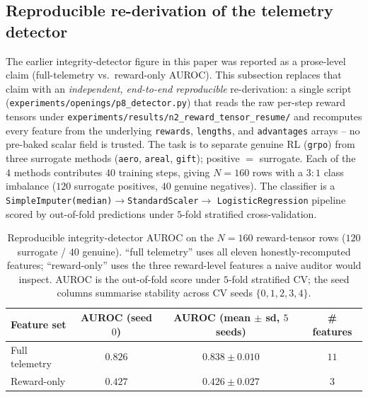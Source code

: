 \subsection{Reproducible re-derivation of the telemetry detector}
\label{sec:p8-reproducible-detector}

The earlier integrity-detector figure in this paper was reported as a
prose-level claim (full-telemetry vs.\ reward-only AUROC). This
subsection replaces that claim with an \emph{independent, end-to-end
reproducible} re-derivation: a single script
(\texttt{experiments/openings/p8\_detector.py}) that reads the raw
per-step reward tensors under
\texttt{experiments/results/n2\_reward\_tensor\_resume/} and recomputes
every feature from the underlying \texttt{rewards}, \texttt{lengths},
and \texttt{advantages} arrays -- no pre-baked scalar field is trusted.
The task is to separate genuine RL (\texttt{grpo}) from three surrogate
methods (\texttt{aero}, \texttt{areal}, \texttt{gift}); positive
$=$ surrogate. Each of the $4$ methods contributes $40$ training steps,
giving $N{=}160$ rows with a $3{:}1$ class imbalance ($120$ surrogate
positives, $40$ genuine negatives). The classifier is a
\texttt{SimpleImputer(median)}$\to$\texttt{StandardScaler}$\to$%
\texttt{LogisticRegression} pipeline scored by out-of-fold predictions
under $5$-fold stratified cross-validation.

\begin{table}[t]
\centering
\small
\caption{Reproducible integrity-detector AUROC on the $N{=}160$
reward-tensor rows ($120$ surrogate / $40$ genuine). ``full telemetry''
uses all eleven honestly-recomputed features; ``reward-only'' uses the
three reward-level features a naive auditor would inspect. AUROC is the
out-of-fold score under $5$-fold stratified CV; the seed columns
summarise stability across CV seeds $\{0,1,2,3,4\}$.}
\label{tab:p8-reproducible-detector}
\begin{tabular}{lccc}
\toprule
Feature set & AUROC (seed $0$) & AUROC (mean $\pm$ sd, $5$ seeds) & \# features \\
\midrule
Full telemetry & $0.826$ & $0.838 \pm 0.010$ & $11$ \\
Reward-only    & $0.427$ & $0.426 \pm 0.027$ & $3$ \\
\bottomrule
\end{tabular}
\end{table}

